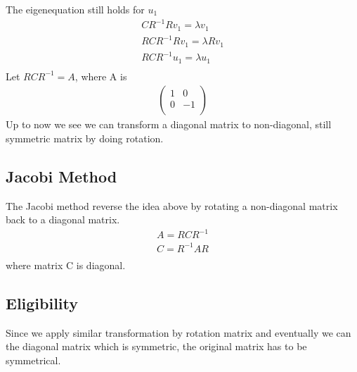 \documentclass[a4paper]{article}
\begin{document}
The eigenequation still holds for $u_1$
\begin{align*}
	C R^{-1} R v_1 = \lambda v_1 \\
	R C R^{-1} R v_1 = \lambda R v_1 \\
	R C R^{-1} u_1 = \lambda  u_1 \\
\end{align*}
Let $R C R^{-1} = A $, where A is
\begin{align*}
	\left( \begin{array}{cc}	
		1 & 0\\
		0 & -1\\
\end{array} \right)
\end{align*}
Up to now we see we can transform a diagonal matrix to non-diagonal, still symmetric matrix by doing rotation. \\
\subsection{Jacobi Method}
The Jacobi method reverse the idea above by rotating a non-diagonal matrix back to a diagonal matrix. 
\begin{align*}
	A = R C R^{-1} \\
	C = R^{-1} A R \\
\end{align*}
where matrix C is diagonal.\\
\subsection{Eligibility}
Since we apply similar transformation by rotation matrix and eventually we can the diagonal matrix which is symmetric, the original matrix has to be symmetrical.\\
\end{document}

